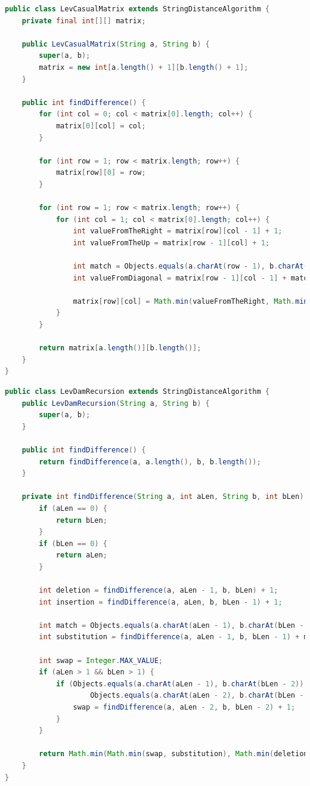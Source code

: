 \documentclass[12pt]{report}
\begin{document}
    \begin{lstlisting}[label=code:levСasualMatrix,caption=Метод для нахождения расстояния Левенштейна итерационно,
        language=java]
public class LevCasualMatrix extends StringDistanceAlgorithm {
    private final int[][] matrix;

    public LevCasualMatrix(String a, String b) {
        super(a, b);
        matrix = new int[a.length() + 1][b.length() + 1];
    }

    public int findDifference() {
        for (int col = 0; col < matrix[0].length; col++) {
            matrix[0][col] = col;
        }

        for (int row = 1; row < matrix.length; row++) {
            matrix[row][0] = row;
        }

        for (int row = 1; row < matrix.length; row++) {
            for (int col = 1; col < matrix[0].length; col++) {
                int valueFromTheRight = matrix[row][col - 1] + 1;
                int valueFromTheUp = matrix[row - 1][col] + 1;

                int match = Objects.equals(a.charAt(row - 1), b.charAt(col - 1)) ? 0 : 1;
                int valueFromDiagonal = matrix[row - 1][col - 1] + match;

                matrix[row][col] = Math.min(valueFromTheRight, Math.min(valueFromTheUp, valueFromDiagonal));
            }
        }

        return matrix[a.length()][b.length()];
    }
}
    \end{lstlisting}

    \begin{lstlisting}[label=code:levDamRecursion,caption=Метод для нахождения расстояния Дамерау-Левенштейна
    рекурсивно,language=java]
public class LevDamRecursion extends StringDistanceAlgorithm {
    public LevDamRecursion(String a, String b) {
        super(a, b);
    }

    public int findDifference() {
        return findDifference(a, a.length(), b, b.length());
    }

    private int findDifference(String a, int aLen, String b, int bLen) {
        if (aLen == 0) {
            return bLen;
        }
        if (bLen == 0) {
            return aLen;
        }

        int deletion = findDifference(a, aLen - 1, b, bLen) + 1;
        int insertion = findDifference(a, aLen, b, bLen - 1) + 1;

        int match = Objects.equals(a.charAt(aLen - 1), b.charAt(bLen - 1)) ? 0 : 1;
        int substitution = findDifference(a, aLen - 1, b, bLen - 1) + match;

        int swap = Integer.MAX_VALUE;
        if (aLen > 1 && bLen > 1) {
            if (Objects.equals(a.charAt(aLen - 1), b.charAt(bLen - 2)) &&
                    Objects.equals(a.charAt(aLen - 2), b.charAt(bLen - 1))) {
                swap = findDifference(a, aLen - 2, b, bLen - 2) + 1;
            }
        }

        return Math.min(Math.min(swap, substitution), Math.min(deletion, insertion));
    }
}
    \end{lstlisting}
\end{document}
